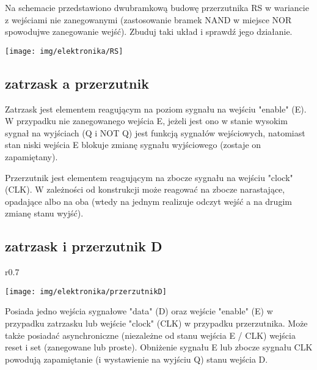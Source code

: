 \documentclass{pdfBooklets}
\begin{document}
\begin{Zadanie}{}{}
\noindent\begin{minipage}[b]{0.6\textwidth}
Na schemacie przedstawiono dwubramkową budowę przerzutnika RS w wariancie z wejściami nie zanegowanymi (zastosowanie bramek NAND w miejsce NOR spowodujwe zanegowanie wejść). Zbuduj taki układ i sprawdź jego działanie.
\end{minipage}
\hfill
\begin{minipage}[b]{0.35\textwidth}
\texttt{[image: img/elektronika/RS]}
\end{minipage}
\end{Zadanie}

\subsection{zatrzask a przerzutnik}

Zatrzask jest elementem reagującym na poziom sygnału na wejściu "enable" (E). W przypadku nie zanegowanego wejścia E, jeżeli jest ono w stanie wysokim sygnał na wyjściach (Q i NOT Q) jest funkcją sygnałów wejściowych, natomiast stan niski wejścia E blokuje zmianę sygnału wyjściowego (zostaje on zapamiętany).

Przerzutnik jest elementem reagującym na zbocze sygnału na wejściu "clock" (CLK). W zależności od konstrukcji może reagować na zbocze narastające, opadające albo na oba (wtedy na jednym realizuje odczyt wejść a na drugim zmianę stanu wyjść).

\student{\clearpage}
\subsection{zatrzask i przerzutnik D}

\begin{wrapfigure}{r}{0.7\textwidth}
  \begin{center}
    \vspace{-25pt}
    \texttt{[image: img/elektronika/przerzutnikD]}
    \vspace{-25pt}
  \end{center}
\end{wrapfigure}

Posiada jedno wejścia sygnałowe "data" (D) oraz wejście "enable" (E) w przypadku zatrzasku lub wejście "clock" (CLK) w przypadku przerzutnika. Może także posiadać asynchroniczne (niezależne od stanu wejścia E / CLK) wejścia reset i set (zanegowane lub proste). Obniżenie sygnału E lub zbocze sygnału CLK powodują zapamiętanie (i wystawienie na wyjściu Q) stanu wejścia D.
\end{document}
